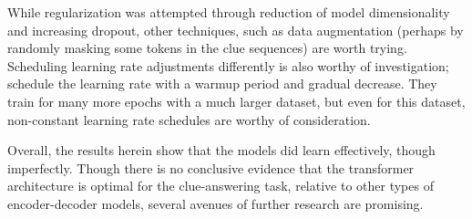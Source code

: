 \documentclass[letterpaper]{article} %
\begin{document}
\begin{NoHyper}
While regularization was attempted through reduction of model dimensionality and increasing dropout, other
techniques, such as data augmentation (perhaps by randomly masking some tokens in the clue sequences) are worth trying.
Scheduling learning rate adjustments differently is also worthy of investigation; \citeauthor{vaswani2017} schedule the
learning rate with a warmup period and gradual decrease.
They train for many more epochs with a much larger dataset, but even for this dataset, non-constant learning rate
schedules are worthy of consideration.

Overall, the results herein show that the models did learn effectively, though imperfectly.
Though there is no conclusive evidence that the transformer architecture is optimal for the clue-answering task,
relative to other types of encoder-decoder models, several avenues of further research are promising.



\end{NoHyper}
\end{document}
